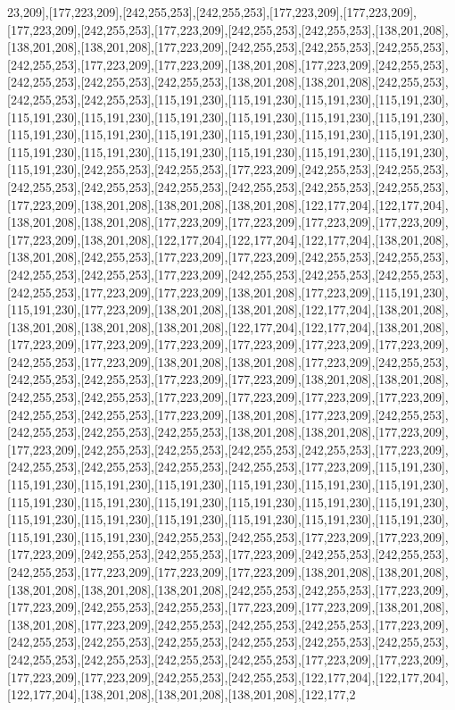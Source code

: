 23,209],[177,223,209],[242,255,253],[242,255,253],[177,223,209],[177,223,209],[177,223,209],[242,255,253],[177,223,209],[242,255,253],[242,255,253],[138,201,208],[138,201,208],[138,201,208],[177,223,209],[242,255,253],[242,255,253],[242,255,253],[242,255,253],[177,223,209],[177,223,209],[138,201,208],[177,223,209],[242,255,253],[242,255,253],[242,255,253],[242,255,253],[138,201,208],[138,201,208],[242,255,253],[242,255,253],[242,255,253],[115,191,230],[115,191,230],[115,191,230],[115,191,230],[115,191,230],[115,191,230],[115,191,230],[115,191,230],[115,191,230],[115,191,230],[115,191,230],[115,191,230],[115,191,230],[115,191,230],[115,191,230],[115,191,230],[115,191,230],[115,191,230],[115,191,230],[115,191,230],[115,191,230],[115,191,230],[115,191,230],[242,255,253],[242,255,253],[177,223,209],[242,255,253],[242,255,253],[242,255,253],[242,255,253],[242,255,253],[242,255,253],[242,255,253],[242,255,253],[177,223,209],[138,201,208],[138,201,208],[138,201,208],[122,177,204],[122,177,204],[138,201,208],[138,201,208],[177,223,209],[177,223,209],[177,223,209],[177,223,209],[177,223,209],[138,201,208],[122,177,204],[122,177,204],[122,177,204],[138,201,208],[138,201,208],[242,255,253],[177,223,209],[177,223,209],[242,255,253],[242,255,253],[242,255,253],[242,255,253],[177,223,209],[242,255,253],[242,255,253],[242,255,253],[242,255,253],[177,223,209],[177,223,209],[138,201,208],[177,223,209],[115,191,230],[115,191,230],[177,223,209],[138,201,208],[138,201,208],[122,177,204],[138,201,208],[138,201,208],[138,201,208],[138,201,208],[122,177,204],[122,177,204],[138,201,208],[177,223,209],[177,223,209],[177,223,209],[177,223,209],[177,223,209],[177,223,209],[242,255,253],[177,223,209],[138,201,208],[138,201,208],[177,223,209],[242,255,253],[242,255,253],[242,255,253],[177,223,209],[177,223,209],[138,201,208],[138,201,208],[242,255,253],[242,255,253],[177,223,209],[177,223,209],[177,223,209],[177,223,209],[242,255,253],[242,255,253],[177,223,209],[138,201,208],[177,223,209],[242,255,253],[242,255,253],[242,255,253],[242,255,253],[138,201,208],[138,201,208],[177,223,209],[177,223,209],[242,255,253],[242,255,253],[242,255,253],[242,255,253],[177,223,209],[242,255,253],[242,255,253],[242,255,253],[242,255,253],[177,223,209],[115,191,230],[115,191,230],[115,191,230],[115,191,230],[115,191,230],[115,191,230],[115,191,230],[115,191,230],[115,191,230],[115,191,230],[115,191,230],[115,191,230],[115,191,230],[115,191,230],[115,191,230],[115,191,230],[115,191,230],[115,191,230],[115,191,230],[115,191,230],[115,191,230],[242,255,253],[242,255,253],[177,223,209],[177,223,209],[177,223,209],[242,255,253],[242,255,253],[177,223,209],[242,255,253],[242,255,253],[242,255,253],[177,223,209],[177,223,209],[177,223,209],[138,201,208],[138,201,208],[138,201,208],[138,201,208],[138,201,208],[242,255,253],[242,255,253],[177,223,209],[177,223,209],[242,255,253],[242,255,253],[177,223,209],[177,223,209],[138,201,208],[138,201,208],[177,223,209],[242,255,253],[242,255,253],[242,255,253],[177,223,209],[242,255,253],[242,255,253],[242,255,253],[242,255,253],[242,255,253],[242,255,253],[242,255,253],[242,255,253],[242,255,253],[242,255,253],[177,223,209],[177,223,209],[177,223,209],[177,223,209],[242,255,253],[242,255,253],[122,177,204],[122,177,204],[122,177,204],[138,201,208],[138,201,208],[138,201,208],[122,177,2